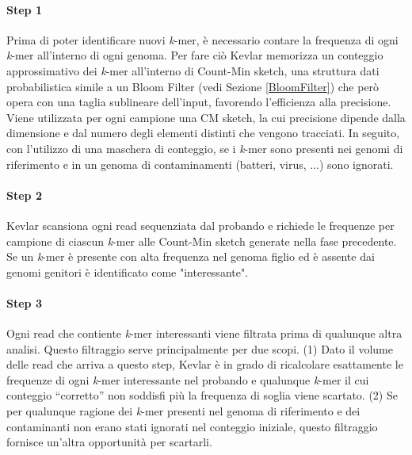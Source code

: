 \documentclass[../main.tex]{subfiles}
\begin{document}
\begin{figure}[ht!]
	\centering
  	\captionsetup{justification=centering}
  	\caption{}
  	\label{fig:kevlar_pipeline}
\end{figure}

\noindent
\paragraph{Step 1} Prima di poter identificare nuovi \textit{k}-mer, è necessario contare la frequenza di ogni \textit{k}-mer all'interno di ogni genoma. Per fare ciò Kevlar memorizza un conteggio approssimativo dei \textit{k}-mer all'interno di Count-Min sketch, una struttura dati probabilistica simile a un Bloom Filter (vedi Sezione \ref{BloomFilter}) che però opera con una taglia sublineare dell'input, favorendo l'efficienza alla precisione. Viene utilizzata per ogni campione una CM sketch, la cui precisione dipende dalla dimensione e dal numero degli elementi distinti che vengono tracciati. In seguito, con l'utilizzo di una maschera di conteggio, se i \textit{k}-mer sono presenti nei genomi di riferimento e in un genoma di contaminamenti (batteri, virus, ...) sono ignorati.

\paragraph{Step 2} Kevlar scansiona ogni read sequenziata dal probando e richiede le frequenze per campione di ciascun \textit{k}-mer alle Count-Min sketch generate nella fase precedente. Se un \textit{k}-mer è presente con alta frequenza nel genoma figlio ed è assente dai genomi genitori è identificato come "interessante". 

\paragraph{Step 3} Ogni read che contiente \textit{k}-mer interessanti viene filtrata prima di qualunque altra analisi. Questo filtraggio serve principalmente per due scopi. (1) Dato il volume delle read che arriva a questo step, Kevlar è in grado di ricalcolare esattamente le frequenze di ogni \textit{k}-mer interessante nel probando e qualunque \textit{k}-mer il cui conteggio ``corretto'' non soddisfi più la frequenza di soglia viene scartato. (2) Se per qualunque ragione dei \textit{k}-mer presenti nel genoma di riferimento e dei contaminanti non erano stati ignorati nel conteggio iniziale, questo filtraggio fornisce un'altra opportunità per scartarli. 
\end{document}
